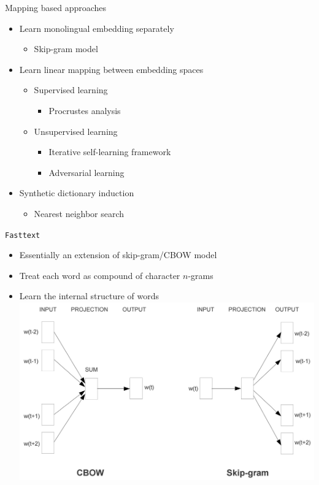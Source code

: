 \documentclass[11pt, a4paper, landscape]{article}
\begin{document}
	\NewPage
	\vfill
	Mapping based approaches
	\begin{itemize}
	\item Learn monolingual embedding separately
	\begin{itemize}
		\item Skip-gram model 
	\end{itemize}
	\item Learn linear mapping between embedding spaces	
	\begin{itemize}
		\item Supervised learning
		\begin{itemize}
			\item Procrustes analysis
		\end{itemize}
		\item Unsupervised learning
		\begin{itemize}
			\item Iterative self-learning framework 			
			\item Adversarial learning
		\end{itemize}
	\end{itemize}
	\item Synthetic dictionary induction
	\begin{itemize}
		\item Nearest neighbor search
	\end{itemize}
	
\end{itemize}
	\vfill
	
	
	
	\NewPage
	\vfill



	\texttt{Fasttext} \cite{bojanowski2017enriching}
	\begin{itemize}
		\item Essentially an extension of skip-gram/CBOW model
		\item Treat each word as compound of character ${n}$-grams
		\item Learn the internal structure of words\\
		
		\includegraphics[width=0.7\linewidth]{skip}
		\centering
	\end{itemize}
	
\end{document}

